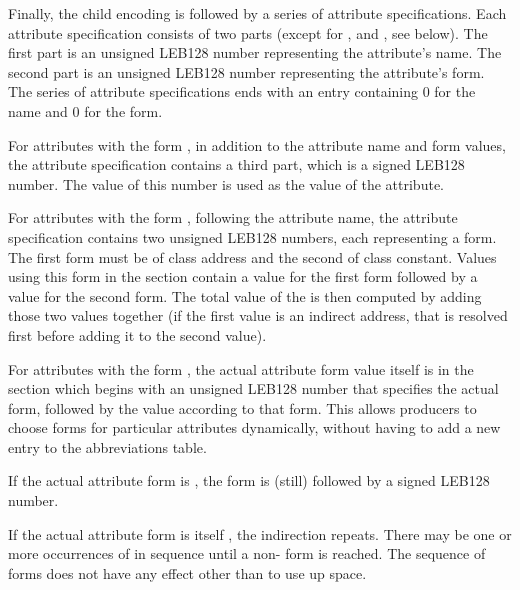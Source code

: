 Finally, the child encoding is followed by a series of
attribute specifications. Each attribute specification
consists of two parts
\bb
(except for \DWFORMimplicitconst{}, \DWFORMaddrxoffset{} 
and \DWFORMindirect{}, see below).
\eb
The first part is an 
unsigned LEB128
number representing the attribute\textquoteright s name. 
The second part is an 
unsigned LEB128 
number representing the attribute\textquoteright s form. 
The series of attribute specifications ends with an
entry containing 0 for the name and 0 for the form.

\bb
For attributes with the form \DWFORMimplicitconstTARG{},
in addition to the attribute name and form values,
\eb 
the attribute specification contains 
a third part, which is a signed LEB128 
number.
\label{chap:attributeencodingsimplicitconst}
The value of this number is used as the value of the 
attribute.  

\bb
For attributes with the form \DWFORMaddrxoffsetTARG{}, following the
attribute name, the attribute specification contains 
two unsigned LEB128 numbers, each representing a form. The first 
form must be of class address and the second of class constant. Values 
using this form in the \dotdebuginfo{} section contain a value for the first 
form followed by a value for the second form. The total value of the 
\DWFORMaddrxoffsetNAME{} is then computed by adding those two values together 
(if the first value is an indirect address, that is resolved first 
before adding it to the second value).
\eb

\bb
For attributes with the form \DWFORMindirectTARG{}, 
the actual attribute form value itself is in the \dotdebuginfo{}
section which begins with an unsigned LEB128 number that 
specifies the actual form, followed by the value according to 
that form.
\eb
This allows producers to choose forms for particular attributes 
 dynamically, 
without having to add a new entry to the abbreviations table.

\bb
If the actual attribute form is \DWFORMimplicitconst, the form is 
(still) followed by a signed LEB128 number. 

If the actual attribute form is itself \DWFORMindirect, the indirection
repeats. There may be one or more occurrences of \DWFORMindirect{} in 
sequence until a non-\DWFORMindirect{} form is reached. The sequence of
\DWFORMindirect{} forms does not have any effect other than to use up 
space.
\eb

